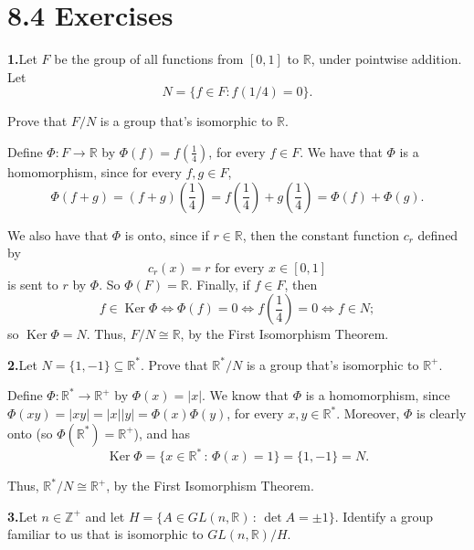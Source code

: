 \documentclass[10pt,]{book}
\theoremstyle{plain}
\theoremstyle{definition}
\theoremstyle{definition}
\theoremstyle{definition}
\theoremstyle{definition}
\numberwithin{equation}{section}
\def\Z{\mathbb{Z}}
\def\R{\mathbb{R}}
\DeclareMathOperator{\Ker}{Ker}
\begin{document}
\section*{8.4 Exercises}
\noindent\textbf{1.}\quad{}Let \(F\) be the group of all functions from \([0,1]\) to \(\R\), under pointwise addition. Let%
\begin{equation*}
N=\{f\in F:
f(1/4)=0\}.
\end{equation*}
%
\par
Prove that \(F/N\) is a group that's isomorphic to \(\R\).%
\par\smallskip
Define \(\Phi:F\rightarrow \R\) by \(\Phi(f)=f\left(\frac{1}{4}\right)\), for every \(f\in F\). We have that \(\Phi\) is a homomorphism, since for every \(f, g\in F\),%
\begin{equation*}
\Phi(f+g)=(f+g)\left(\frac{1}{4}\right)=f\left(\frac{1}{4}\right)+g\left(\frac{1}{4}\right)=\Phi(f)+\Phi(g).
\end{equation*}
%
\par
We also have that \(\Phi\) is onto, since if \(r\in \R\), then the constant function \(c_r\) defined by%
\begin{equation*}
c_r(x)=r \mbox{ for every \(x\in
[0,1]\)}
\end{equation*}
is sent to \(r\) by \(\Phi\). So \(\Phi(F)=\R\). Finally, if \(f\in F\), then%
\begin{equation*}
f\in \Ker \Phi \Leftrightarrow \Phi(f)=0 \Leftrightarrow
f\left(\frac{1}{4}\right)=0 \Leftrightarrow f\in N;
\end{equation*}
so \(\Ker
\Phi=N\). Thus, \(F/N \cong \R\), by the First Isomorphism Theorem.%
\par\smallskip
\noindent\textbf{2.}\quad{}Let \(N=\{1,-1\}\subseteq \R^*\). Prove that \(\R^*/N\) is a group that's isomorphic to \(\R^+\).%
\par\smallskip
Define \(\Phi: \R^* \rightarrow \R^+\) by \(\Phi(x)=|x|\). We know that \(\Phi\) is a homomorphism, since \(\Phi(xy)=|xy|=|x||y|=\Phi(x)\Phi(y)\), for every \(x,y\in \R^*\). Moreover, \(\Phi\) is clearly onto (so \(\Phi(\R^*)=\R^+\)), and has%
\begin{equation*}
\Ker \Phi=\{x\in \R^*\,:\,\Phi(x)=1\}=\{1,-1\}=N.
\end{equation*}
%
\par
Thus, \(\R^*/N \cong \R^+\), by the First Isomorphism Theorem.%
\par\smallskip
\noindent\textbf{3.}\quad{}Let \(n\in \Z^+\) and let \(H=\{A\in GL(n,\R)\,:\, \det A =\pm
1\}\). Identify a group familiar to us that is isomorphic to \(GL(n,\R)/H\).%
\end{document}

